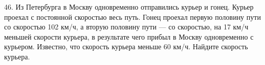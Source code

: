 46. Из Петербурга в Москву одновременно отправились курьер и гонец. Курьер проехал с постоянной скоростью весь путь. Гонец проехал первую половину пути со скоростью 102 км/ч, а вторую половину пути --- со скоростью, на 17 км/ч меньшей скорости курьера, в результате чего прибыл в Москву одновременно с курьером. Известно, что скорость курьера меньше 60 км/ч. Найдите скорость курьера.\\
